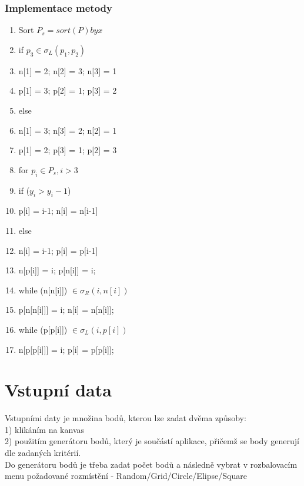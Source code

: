\documentclass[a4paper, 12pt]{article}
\begin{document}
\subsubsection{Implementace metody}
\begin{enumerate}
	\item  Sort $P_s = sort (P) by x$
	\item if $p_3 \in \sigma_L (p_1, p_2)$
	\item \hspace {1cm} n[1] = 2; n[2] = 3; n[3] = 1
	\item \hspace {1cm} p[1] = 3; p[2] = 1; p[3] = 2
	\item else
	\item \hspace {1cm} n[1] = 3; n[3] = 2; n[2] = 1
	\item \hspace {1cm} p[1] = 2; p[3] = 1; p[2] = 3
	\item for $p_i \in P_s, i > 3$
	\item \hspace {1cm} if ($y_i>y_i-1$) 
	\item \hspace {2cm} p[i] = i-1; n[i] = n[i-1]
	\item \hspace {1cm} else 
	\item \hspace {2cm} n[i] = i-1; p[i] = p[i-1]
	\item \hspace {1cm}n[p[i]] = i; p[n[i]] = i;
	\item \hspace {1cm}while (n[n[i]]) $\in \sigma_R (i, n[i]) $
	\item \hspace {2cm} p[n[n[i]]] = i; n[i] = n[n[i]];
	\item \hspace {1cm} while (p[p[i]]) $\in \sigma_L (i, p[i]) $
	\item \hspace {2cm} n[p[p[i]]] = i; p[i] = p[p[i]];
\end{enumerate}
\clearpage



\section{Vstupní data}

Vstupními daty je množina bodů, kterou lze zadat dvěma způsoby:\\
1) klikáním na kanvas\\
2) použitím generátoru bodů, který je součástí aplikace, přičemž se body generují dle zadaných kritérií.\\


 Do generátoru bodů je třeba zadat počet bodů a následně vybrat v rozbalovacím menu 
 požadované rozmístění - Random/Grid/Circle/Elipse/Square 
\end{document}
